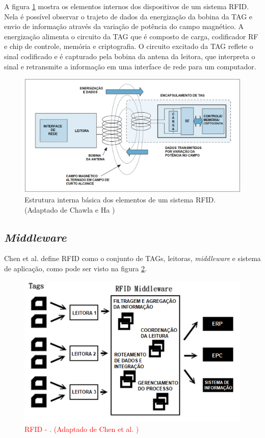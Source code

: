 A figura \ref{fig:DetalhesRFID} mostra os elementos internos dos dispositivos de um sistema RFID. Nela é possível observar o trajeto de dados da energização da bobina da TAG e envio de informação através da variação de potência do campo magnético. A energização alimenta o circuito da TAG que é composto de carga, codificador RF e chip de controle, memória e criptografia. O circuito excitado da TAG reflete o sinal codificado e é capturado pela bobina da antena da leitora, que interpreta o sinal e retransmite a informação em uma interface de rede para um computador.

\begin{figure}[H]
    \centering
    \includegraphics[width=0.8\linewidth]{figs/Fundamentos/RFIDdetails.png}
    \caption{Estrutura interna básica dos elementos de um sistema RFID. (Adaptado de Chawla e Ha \cite{chawla2007overview})}
    \label{fig:DetalhesRFID}
\end{figure}

\subsection{\textit{Middleware}} \label{section: middleware}

Chen et al. \cite{chenUsingRFID} define RFID como o conjunto de TAGs, leitoras, \textit{middleware} e sistema de aplicação, como pode ser visto na figura \ref{fig:RFID-Middleware}.

\begin{figure}[H]
    \centering
    \includegraphics[width=0.6\linewidth]{figs/Fundamentos/RFID.png}
    \caption{\textcolor{red}{RFID - . (Adaptado de Chen et al. \cite{chenUsingRFID})}}
    \label{fig:RFID-Middleware}
\end{figure}

